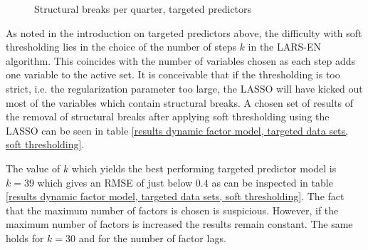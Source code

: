 \documentclass[12pt]{article}
\begin{document}
\begin{figure}[htp]
\centering
{}
\caption{Structural breaks per quarter, targeted predictors}
\label{structural breaks per period, targeted predictors}
\end{figure}



\clearpage

As noted in the introduction on targeted predictors above, the difficulty with soft thresholding lies in the choice of the number of steps $k$ in the LARS-EN algorithm. This coincides with the number of variables chosen as each step adds one variable to the active set. It is conceivable that if the thresholding is too strict, i.e. the regularization parameter too large, the LASSO will have kicked out most of the variables which contain structural breaks. A chosen set of results of the removal of structural breaks after applying soft thresholding using the LASSO can be seen in table \ref{results dynamic factor model, targeted data sets, soft thresholding}. 

The value of $k$ which yields the best performing targeted predictor model is $k=39$ which gives an RMSE of just below $0.4$ as can be inspected in table \ref{results dynamic factor model, targeted data sets, soft thresholding}. The fact that the maximum number of factors is chosen is suspicious. However, if the maximum number of factors is increased the results remain constant. The same holds for $k=30$ and for the number of factor lags. \\
\end{document}
